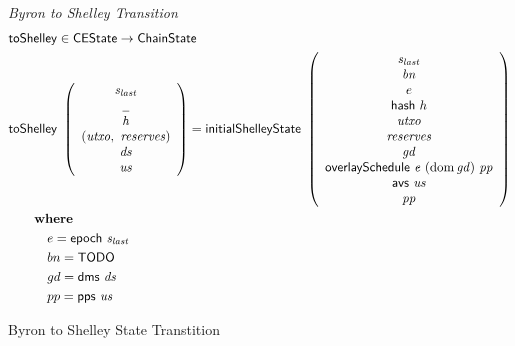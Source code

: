 \begin{figure}[htb]
  \emph{Byron to Shelley Transition}
  \begin{align*}
      & \fun{toShelley} \in \CEState \to \ChainState \\
      & \fun{toShelley}~
      \left(
        \begin{array}{c}
          \var{s_{last}} \\
          \wcard \\
          \var{h} \\
          (\var{utxo},~\var{reserves}) \\
          \var{ds} \\
          \var{us}
        \end{array}
      \right)
      =
      \fun{initialShelleyState}~
      \left(
        \begin{array}{c}
          \var{s_{last}} \\
          \var{bn} \\
          e \\
          \fun{hash}~{h} \\
          \var{utxo} \\
          \var{reserves} \\
          \var{gd} \\
          \overlaySchedule{e}{(\dom{gd})}{pp} \\
          \fun{avs}~\var{us} \\
          \var{pp} \\
        \end{array}
      \right) \\
      & ~~~~\where \\
      & ~~~~~~~~~e = \epoch{s_{last}} \\
      & ~~~~~~~~~bn = \mathsf{TODO} \\
      & ~~~~~~~~~gd = \fun{dms}~\var{ds} \\
      & ~~~~~~~~~pp = \pps{us} \\
  \end{align*}

  \caption{Byron to Shelley State Transtition}
  \label{fig:functions:to-shelley}
\end{figure}

